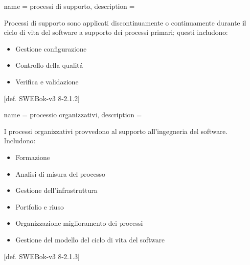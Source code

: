 {
name = processi di supporto,
description = {Processi di supporto sono applicati discontinuamente o continuamente durante il ciclo di vita del software a supporto dei processi primari; questi includono:\begin{itemize}
\item Gestione configurazione
\item Controllo della qualit\'a
\item Verifica e validazione
\end{itemize}
[def. SWEBok-v3 8-2.1.2]
}
}

{
name = processio organizzativi,
description = {I processi organizzativi provvedono al supporto all'ingegneria del software. Includono: \begin{itemize}
\item Formazione
\item Analisi di misura del processo
\item Gestione dell'infrastruttura
\item Portfolio e riuso
\item Organizzazione miglioramento dei processi
\item Gestione del modello del ciclo di vita del software
\end{itemize}
[def. SWEBok-v3 8-2.1.3]
}
}

